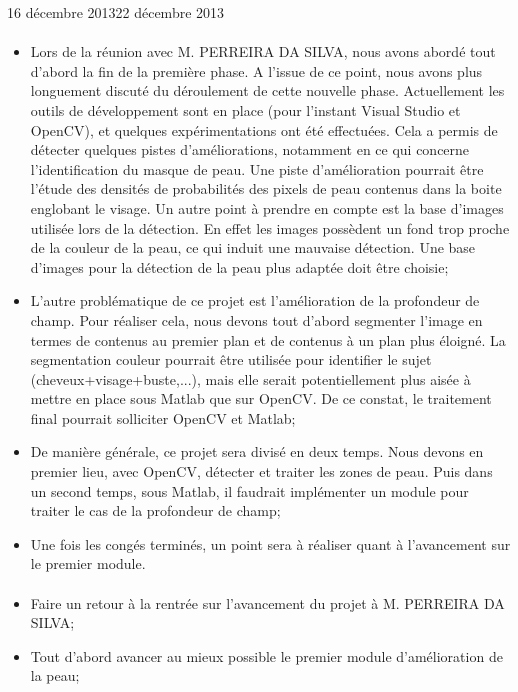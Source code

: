 \documentclass[11pt, french,screen]{report-rd-info}
\begin{document}
\begin{fichesuivi}{16 décembre 2013}{22 décembre 2013}
\paragraph{}
	\begin{echange}
		\begin{itemize}
			\item Lors de la réunion avec M. PERREIRA DA SILVA, nous avons abordé tout d'abord la fin de la première phase. A l'issue de ce point, nous avons plus longuement discuté du déroulement de cette nouvelle phase. Actuellement les outils de développement sont en place (pour l'instant Visual Studio et OpenCV), et quelques expérimentations ont été effectuées. Cela a permis de détecter quelques pistes d'améliorations, notamment en ce qui concerne l'identification du masque de peau. Une piste d'amélioration pourrait être l'étude des densités de probabilités des pixels de peau contenus dans la boite englobant le visage. Un autre point à prendre en compte est la base d'images utilisée lors de la détection. En effet les images possèdent un fond trop proche de la couleur de la peau, ce qui induit une mauvaise détection. Une base d'images pour la détection de la peau plus adaptée doit être choisie;
			\item L'autre problématique de ce projet est l'amélioration de la profondeur de champ. Pour réaliser cela, nous devons tout d'abord segmenter l'image en termes de contenus au premier plan et de contenus à un plan plus éloigné. La segmentation couleur pourrait être utilisée pour identifier le sujet (cheveux+visage+buste,...), mais elle serait potentiellement plus aisée à mettre en place sous Matlab que sur OpenCV. De ce constat, le traitement final pourrait solliciter OpenCV et Matlab;
			\item De manière générale, ce projet sera divisé en deux temps. Nous devons en premier lieu, avec OpenCV, détecter et traiter les zones de peau. Puis dans un second temps, sous Matlab, il faudrait implémenter un module pour traiter le cas de la profondeur de champ;
			\item Une fois les congés terminés, un point sera à réaliser quant à l'avancement sur le premier module. 
		\end{itemize}
	\end{echange}

\paragraph*{}
	\begin{planification}
		\begin{itemize}
			\item Faire un retour à la rentrée sur l'avancement du projet à M. PERREIRA DA SILVA;
			\item Tout d'abord avancer au mieux possible le premier module d'amélioration de la peau;
		\end{itemize}
	\end{planification}
\end{fichesuivi}
\end{document}
